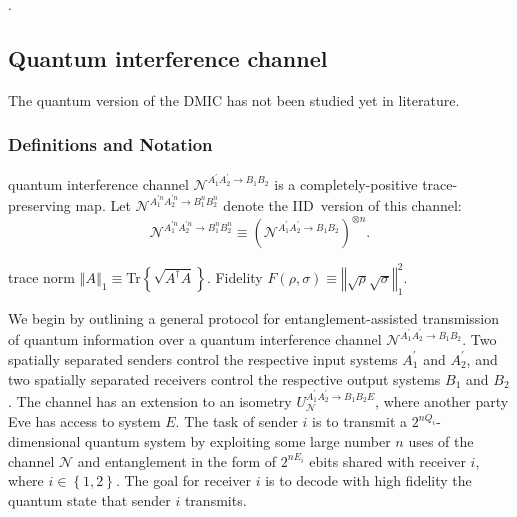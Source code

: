 \documentclass[aps,11pt,twoside,letterpaper]{article}
\begin{document}
		
		
		\cite{YHD2006}
		
		\cite{DH2006}.

		


	
	\subsection{Quantum interference channel}


		The quantum version of the DMIC has not been studied yet in literature. 


		\subsubsection{Definitions and Notation}

		quantum interference channel $\mathcal{N}^{A_{1}^{\prime}A_{2}^{\prime
		}\rightarrow B_{1}B_{2}}$ is a completely-positive trace-preserving map. Let
		$\mathcal{N}^{A_{1}^{\prime n}A_{2}^{\prime n}\rightarrow B_{1}^{n}B_{2}^{n}}$
		denote the IID\ version of this channel:%
		\[
		\mathcal{N}^{A_{1}^{\prime n}A_{2}^{\prime n}\rightarrow B_{1}^{n}B_{2}^{n}%
		}\equiv(\mathcal{N}^{A_{1}^{\prime}A_{2}^{\prime}\rightarrow B_{1}B_{2}%
		})^{\otimes n}.
		\]

		
		trace norm $\left\Vert A\right\Vert _{1}\equiv$Tr$\left\{  \sqrt{A^{\dag}%
		A}\right\}  $. Fidelity $F\left(  \rho,\sigma\right)  \equiv\left\Vert
		\sqrt{\rho}\sqrt{\sigma}\right\Vert _{1}^{2}$.


		    

		

		We begin by outlining a general protocol for entanglement-assisted
		transmission of quantum information over a quantum interference channel
		$\mathcal{N}^{A_{1}^{\prime}A_{2}^{\prime}\rightarrow B_{1}B_{2}}$. Two
		spatially separated senders control the respective input systems
		$A_{1}^{\prime}$ and $A_{2}^{\prime}$, and two spatially separated receivers
		control the respective output systems $B_{1}$ and $B_{2}$. The channel has an
		extension to an isometry $U_{\mathcal{N}}^{A_{1}^{\prime}A_{2}^{\prime
		}\rightarrow B_{1}B_{2}E}$, where another party Eve has access to system $E$.
		The task of sender $i$ is to transmit a $2^{nQ_{i}}$-dimensional quantum
		system by exploiting some large number $n$ uses of the channel $\mathcal{N}$
		and entanglement in the form of $2^{nE_{i}}$ ebits shared with receiver $i$,
		where $i\in\left\{  1,2\right\}  $. The goal for receiver $i$ is to decode
		with high fidelity the quantum state that sender $i$ transmits.
\end{document}
